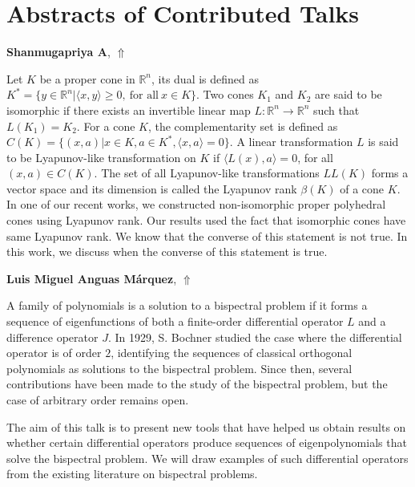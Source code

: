 \documentclass[ILAS2025-program.tex]{subfiles}
\begin{document}
\section{Abstracts of Contributed Talks}


\hypertarget{down0423}{}\begin{ilasabstract}
    
\textbf{Shanmugapriya A},  \hfill \hyperlink{up0423}{$\Uparrow$}
    
    
\mtskip
    Let $K$ be a proper cone in $\mathbb{R}^n$, its dual is defined as $K^*=\{y\in \mathbb{R}^n|\langle x,y\rangle\geq 0, ~\text{for all}~ x\in K\}$. Two cones $K_1$ and $K_2$ are said to be isomorphic if there exists an invertible linear map $L:\mathbb{R}^n\rightarrow \mathbb{R}^n$ such that  $L(K_1)=K_2$. For a cone $K$, the complementarity set is defined as $C(K)=\{(x,a)|x\in K, a\in K^*,\langle x,a \rangle=0\}$. A linear transformation $L$ is said to be Lyapunov-like transformation on $K$ if $\langle L(x), a \rangle=0$, for all $(x,a)\in C(K)$. The set of all Lyapunov-like transformations $LL(K)$ forms a vector space and its dimension is called the Lyapunov rank $\beta(K)$ of a cone $K$. In one of our recent works, we constructed non-isomorphic proper polyhedral cones using Lyapunov rank. Our results used the fact that isomorphic cones have same Lyapunov rank.  We know that the converse of this statement is not true. In this work, we discuss  when the converse of this statement is true. 

\end{ilasabstract}
    

\hypertarget{down0401}{}\begin{ilasabstract}
    
\textbf{Luis Miguel Anguas Márquez},  \hfill \hyperlink{up0401}{$\Uparrow$}
    
    
\mtskip
    A family of polynomials is a solution to a bispectral problem if it forms a sequence of eigenfunctions of both a finite-order differential operator $L$ and a difference operator $J$. In 1929, S. Bochner studied the case where the differential operator is of order $2$, identifying the sequences of classical orthogonal polynomials as solutions to the bispectral problem. Since then, several contributions have been made to the study of the bispectral problem, but the case of arbitrary order remains open.

The aim of this talk is to present new tools that have helped us obtain results on whether certain differential operators produce sequences of eigenpolynomials that solve the bispectral problem. We will draw examples of such differential operators from the existing literature on bispectral problems.
\end{ilasabstract}
    
\end{document}
